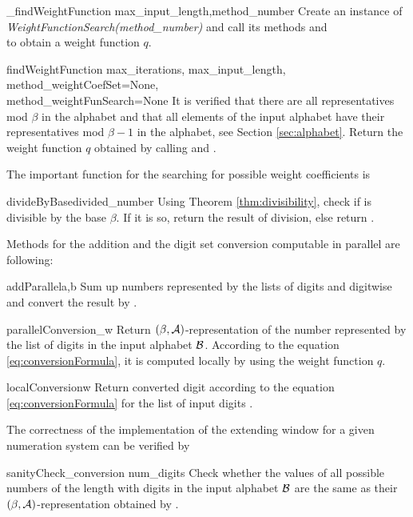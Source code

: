 \begin{method}{\_findWeightFunction}{ max\_input\_length,method\_number}
Create an instance of \emph{WeightFunctionSearch(method\_number)} and call its methods  and \\  to obtain a weight function $q$.
\end{method}


\begin{method}{findWeightFunction}{ max\_iterations, max\_input\_length, method\_weightCoefSet=None,\\ method\_weightFunSearch=None}
It is verified that there are all representatives mod $\beta$ in the alphabet and that all elements of the input alphabet have their representatives mod $\beta-1$ in the alphabet, see Section \ref{sec:alphabet}.
Return the weight function $q$ obtained by calling  and .
\end{method}

The important function for the searching for possible weight coefficients is

\begin{method}{divideByBase}{divided\_number}
Using Theorem \ref{thm:divisibility}, check if  is divisible by the base $\beta$. If it is so, return the result of division, else return .
\end{method}


Methods for the addition and the digit set conversion computable in parallel are following:

\begin{method}{addParallel}{a,b}
Sum up numbers represented by the lists of digits  and  digitwise and convert the result by . 
\end{method}


\begin{method}{parallelConversion}{\_w}
Return $(\beta,\mathcal{A})$-representation of the number represented by the list  of digits in the input alphabet $\mathcal{B}$. According to the equation \eqref{eq:conversionFormula}, it is computed locally by using the weight function $q$.
\end{method}


\begin{method}{localConversion}{w}
Return converted digit according to the equation \eqref{eq:conversionFormula} for the list of input digits .
\end{method}


The correctness of the implementation of the extending window for a given numeration system can be verified by
 
\begin{method}{sanityCheck\_conversion}{ num\_digits}
Check whether the values of all possible numbers of the length  with digits in the input alphabet $\mathcal{B}$ are the same as their $(\beta, \mathcal{A})$-representation obtained by .   
\end{method}

